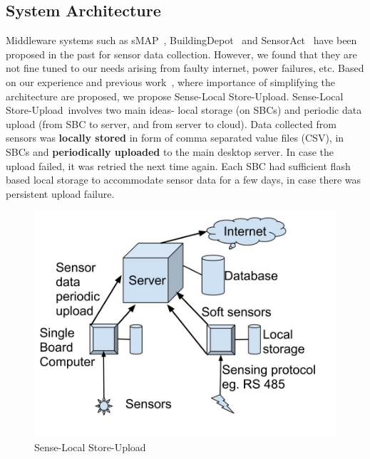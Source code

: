 \documentclass[10pt]{sensys-proc}
\newcommand{\paradigm}{Sense-Local Store-Upload}
\newcommand{\paradigms}{Sense-Local Store-Upload~}
\begin{document}
\subsection{System Architecture}	
\label{sec:architecture}
Middleware systems such as sMAP~\cite{smap}, BuildingDepot~\cite{buildingdepot} and SensorAct~\cite{Arjunan12} have been proposed in the past for sensor data collection. However, we found that they are not fine tuned to our needs arising from faulty internet, power failures, etc. Based on our experience and previous work~\cite{hitchhiker_residential}, where importance of simplifying the architecture are proposed, we propose \paradigm. \paradigms involves two main ideas- local storage (on SBCs) and periodic data upload (from SBC to server, and from server to cloud). Data collected from sensors was \textbf{locally stored} in form of comma separated value files (CSV), in SBCs and \textbf{periodically uploaded} to the main desktop server. In case the upload failed, it was retried the next time again. Each SBC had sufficient flash based local storage to accommodate sensor data for a few days, in case there was persistent upload failure.

\begin{figure} 
\vspace{-4mm}    
    \centering \includegraphics[scale=0.13]{./figures/architecture.jpg}  
    \vspace{-5mm}  
    \caption{\paradigm}   
    \label{fig:architecture}   
\end{figure}
\end{document}
